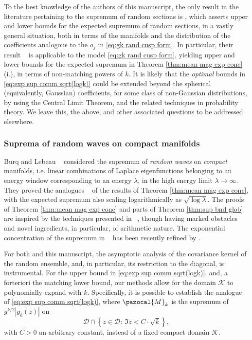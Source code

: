 \documentclass[12pt, a4paper]{amsart}
\theoremstyle{definition}
\newcommand {\1} {\mathbf{1}}
\newcommand {\M} {\pazocal {M}}
\newcommand {\Dc} {\mathcal{D}}
\newcommand {\Kc} {\mathcal{K}}
\numberwithin{equation}{section}
\begin{document}
To the best knowledge of the authors of this manuscript, the only result in the literature pertaining to the supremum of random sections is \cite[Theorem 1.4]{DrLiMar sup}, which asserts upper and lower bounds for the expected supremum
of random sections, in a vastly general situation, both in terms of the manifolds and the distribution of the coefficients analogous to the $a_{j}$ in \eqref{eq:gk rand cusp form}. In particular, their result
~\cite[Corollary 4.1]{DrLiMar sup} is applicable to the model \eqref{eq:gk rand cusp form}, yielding upper and lower bounds for the expected supremum in Theorem \ref{thm:mean mag exp conc}(i.), in terms of
non-matching powers of $k$. It is likely that the {\em optimal} bounds in \eqref{eq:exp sup comm sqrt(logk)} could be extended beyond the spherical (equivalently, Gaussian) coefficients, for some class of non-Gaussian distributions,
by using the Central Limit Theorem, and the related techniques in probability theory. We leave this, the above, and other associated questions to be addressed elsewhere.


\subsubsection{{\bf Suprema of random waves on compact manifolds}}


Burq and Lebeau ~\cite{BurqLebeau} considered the supremum of {\em random waves} on {\em compact} manifolds, i.e. linear combinations of Laplace eigenfunctions belonging to an energy window corresponding to an energy $\lambda$,
in the high energy limit $\lambda\rightarrow\infty$. They proved the analogues ~\cite[Theorem 5]{BurqLebeau} of the results of Theorem \ref{thm:mean mag exp conc}, with the expected supremum also scaling logarithmically as $\sqrt{\log{\lambda}}$.
The proofs of Theorem \ref{thm:mean mag exp conc} and parts of Theorem \ref{thm:sup bnd glob} are inspired by the techniques presented in ~\cite{BurqLebeau}, though having marked obstacles and novel ingredients, in particular, of arithmetic nature.
The exponential concentration of the supremum in ~\cite[Theorem 5]{BurqLebeau} has been recently refined by \cite[Theorem 2.3]{AdFeYa}.

For both \cite{BurqLebeau} and this manuscript, the asymptotic analysis of the covariance kernel of the random ensemble, and, in particular, its restriction to the diagonal, is instrumental.
For the upper bound in \eqref{eq:exp sup comm sqrt(logk)}, and, a forteriori the matching lower bound, our methods allow for the domain $\Kc$ to polynomially expand with $k$. Specifically, it is possible to 
establish the analogue of \eqref{eq:exp sup comm sqrt(logk)}, where $\M_{k}$ is the supremum of $y^{k/2}|g_{k}(z)|$ on $$\Dc\cap \left\{z\in \Dc:\: \Im{z} < C\cdot \sqrt{k}\right\},$$ with $C>0$ an arbitrary constant,
instead of a fixed compact domain $\Kc$.
\end{document}
